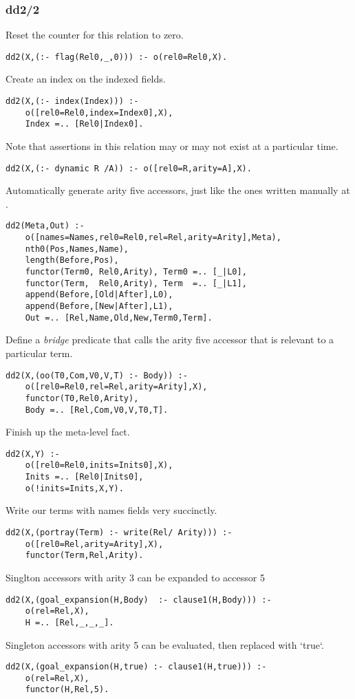 \documentclass[twocolumn,global]{svjour}
\begin{document}
\subsubsection{ dd2/2
}
 Reset the counter for this relation to zero.  \begin{Verbatim}
dd2(X,(:- flag(Rel0,_,0))) :- o(rel0=Rel0,X).
\end{Verbatim}
 Create an index on the indexed fields.  \begin{Verbatim}
dd2(X,(:- index(Index))) :-
    o([rel0=Rel0,index=Index0],X),
    Index =.. [Rel0|Index0].
\end{Verbatim}
 Note that assertions in this relation may or may not
exist at a particular time.  \begin{Verbatim}
dd2(X,(:- dynamic R /A)) :- o([rel0=R,arity=A],X).
\end{Verbatim}
 Automatically generate arity five accessors, just like
the ones written manually at .
\begin{Verbatim}
dd2(Meta,Out) :-
    o([names=Names,rel0=Rel0,rel=Rel,arity=Arity],Meta),
    nth0(Pos,Names,Name),
    length(Before,Pos),
    functor(Term0, Rel0,Arity), Term0 =.. [_|L0],
    functor(Term,  Rel0,Arity), Term  =.. [_|L1],
    append(Before,[Old|After],L0),
    append(Before,[New|After],L1),
    Out =.. [Rel,Name,Old,New,Term0,Term].
\end{Verbatim}
 Define a {\em bridge} predicate that calls the
arity five accessor that is relevant to a particular term.  \begin{Verbatim}
dd2(X,(oo(T0,Com,V0,V,T) :- Body)) :-
    o([rel0=Rel0,rel=Rel,arity=Arity],X),
    functor(T0,Rel0,Arity),
    Body =.. [Rel,Com,V0,V,T0,T].
\end{Verbatim}
 Finish up the meta-level fact.  \begin{Verbatim}
dd2(X,Y) :-
    o([rel0=Rel0,inits=Inits0],X),
    Inits =.. [Rel0|Inits0],
    o(!inits=Inits,X,Y).
\end{Verbatim}
 Write our terms with names fields very succinctly.  \begin{Verbatim}
dd2(X,(portray(Term) :- write(Rel/ Arity))) :-
    o([rel0=Rel,arity=Arity],X),
    functor(Term,Rel,Arity).
\end{Verbatim}
 Singlton accessors with arity 3 can be expanded to accessor 5   \begin{Verbatim}
dd2(X,(goal_expansion(H,Body)  :- clause1(H,Body))) :-
    o(rel=Rel,X),
    H =.. [Rel,_,_,_].
\end{Verbatim}
 Singleton accessors with arity 5 can be evaluated,
    then replaced with `true`.  \begin{Verbatim}
dd2(X,(goal_expansion(H,true) :- clause1(H,true))) :-
    o(rel=Rel,X),
    functor(H,Rel,5).
\end{Verbatim}
\end{document}

